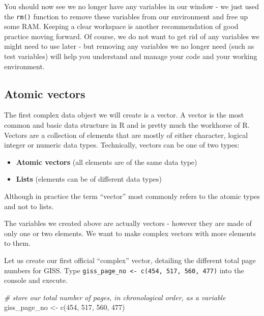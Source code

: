 \documentclass[
]{book}
\newenvironment{Shaded}{\begin{snugshade}}{\end{snugshade}}
\newcommand{\CommentTok}[1]{\textcolor[rgb]{0.56,0.35,0.01}{\textit{#1}}}
\newcommand{\DecValTok}[1]{\textcolor[rgb]{0.00,0.00,0.81}{#1}}
\newcommand{\FunctionTok}[1]{\textcolor[rgb]{0.00,0.00,0.00}{#1}}
\newcommand{\NormalTok}[1]{#1}
\newcommand{\OtherTok}[1]{\textcolor[rgb]{0.56,0.35,0.01}{#1}}
\providecommand{\tightlist}{%
  \setlength{\itemsep}{0pt}\setlength{\parskip}{0pt}}
\begin{document}
You should now see we no longer have any variables in our window - we just used the \texttt{rm()} function to remove these variables from our environment and free up some RAM. Keeping a clear workspace is another recommendation of good practice moving forward. Of course, we do not want to get rid of any variables we might need to use later - but removing any variables we no longer need (such as test variables) will help you understand and manage your code and your working environment.

\hypertarget{atomic-vectors}{%
\subsection{Atomic vectors}\label{atomic-vectors}}

The first complex data object we will create is a vector. A vector is the most common and basic data structure in R and is pretty much the workhorse of R. Vectors are a collection of elements that are mostly of either character, logical integer or numeric data types. Technically, vectors can be one of two types:

\begin{itemize}
\tightlist
\item
  \textbf{Atomic vectors} (all elements are of the same data type)
\item
  \textbf{Lists} (elements can be of different data types)
\end{itemize}

Although in practice the term ``vector'' most commonly refers to the atomic types and not to lists.

The variables we created above are actually vectors - however they are made of only one or two elements. We want to make complex vectors with more elements to them.

Let us create our first official ``complex'' vector, detailing the different total page numbers for GISS. Type \texttt{giss\_page\_no\ \textless{}-\ c(454,\ 517,\ 560,\ 477)} into the console and execute.

\begin{Shaded}
\begin{Highlighting}[]
\CommentTok{\# store our total number of pages, in chronological order, as a variable}
\NormalTok{giss\_page\_no }\OtherTok{\textless{}{-}} \FunctionTok{c}\NormalTok{(}\DecValTok{454}\NormalTok{, }\DecValTok{517}\NormalTok{, }\DecValTok{560}\NormalTok{, }\DecValTok{477}\NormalTok{)}
\end{Highlighting}
\end{Shaded}
\end{document}

